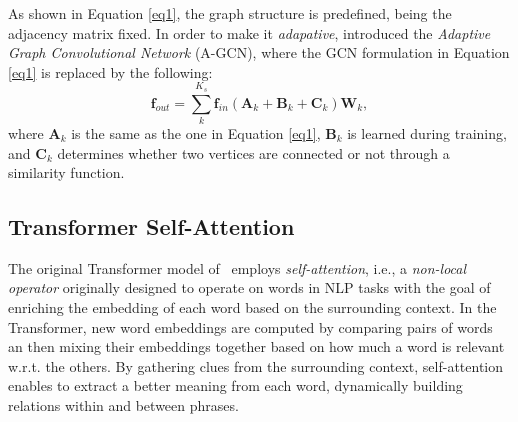 \documentclass[times,twocolumn,final,authoryear]{elsarticle}
\begin{document}
As shown in Equation \ref{eq1}, the graph structure is predefined, being the adjacency matrix fixed. In order to make it \textit{adapative}, \cite{Shi2018TwoStreamAG} introduced the \textit{Adaptive Graph Convolutional Network} (A-GCN), where the GCN formulation in Equation \ref{eq1} is replaced by the following:
\begin{equation}
    \textbf{f}_{out}=\sum^{K_s}_k\textbf{f}_{in}(\mathbf{A}_k+\mathbf{B}_k+\mathbf{C}_k)\textbf{W}_k ,
\end{equation}
where ${\textbf{A}}_k$ is the same as the one in Equation \ref{eq1}, $\textbf{B}_k$ is learned during training, and $\textbf{C}_k$ determines whether two vertices are connected or not through a similarity function. 

\subsection{Transformer Self-Attention}
The original Transformer model of~\cite{attention} employs \textit{self-attention}, i.e., a \textit{non-local operator} originally designed to operate on words in NLP tasks with the goal of enriching the embedding of each word based on the surrounding context. In the Transformer, new word embeddings are computed by comparing pairs of words an then mixing their embeddings together based on how much a word is relevant w.r.t. the others. By gathering clues from the surrounding context, self-attention enables to extract a better meaning from each word, dynamically building relations within and between phrases.
\end{document}
